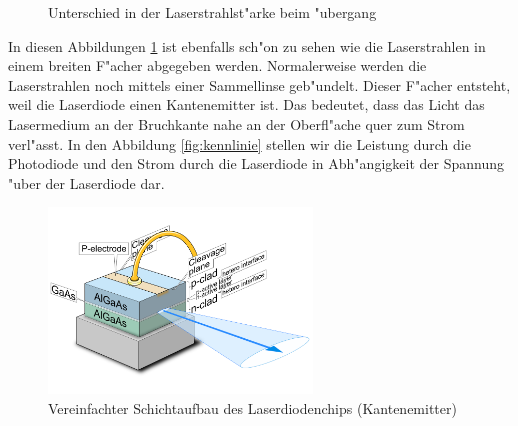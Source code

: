 \begin{refsection}
\begin{figure}
\centering
{}\hfill
{}
\caption{Unterschied in der Laserstrahlst"arke beim "ubergang}
\label{fig:faecher}
\end{figure}

In diesen Abbildungen \ref{fig:faecher} ist ebenfalls sch"on zu sehen wie die 
Laserstrahlen in einem breiten F"acher abgegeben werden. Normalerweise werden 
die Laserstrahlen noch mittels einer Sammellinse geb"undelt. Dieser F"acher 
entsteht, weil die Laserdiode einen Kantenemitter ist. Das bedeutet, dass das 
Licht das Lasermedium an der Bruchkante nahe an der Oberfl"ache quer zum Strom 
verl"asst. In den Abbildung 
\ref{fig:kennlinie} stellen wir die Leistung durch die Photodiode und den 
Strom durch die Laserdiode in Abh"angigkeit der Spannung "uber der Laserdiode 
dar. 
\begin{figure}
\centering
\includegraphics[width = 7cm]{laser/bilder/Diodenaufbau.pdf}
\caption{Vereinfachter Schichtaufbau des Laserdiodenchips (Kantenemitter)
\cite{WikiDiode}}
\label{Laserdiodeaufbau}
\end{figure}


\end{refsection}
